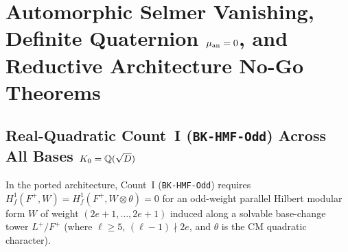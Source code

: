 \section{Automorphic Selmer Vanishing, Definite Quaternion $\mu_{\mathrm{an}}=0$, and Reductive Architecture No-Go Theorems}\label{sec:5:selmer}

\subsection{Real-Quadratic Count~I (\texttt{BK-HMF-Odd}) Across All Bases $K_0 = \mathbb{Q}(\sqrt{D})$}\label{sec:5:count1}

In the ported architecture, Count~I (\texttt{BK-HMF-Odd}) requires $H^1_f(F^+, W) = H^1_f(F^+, W \otimes \theta) = 0$ for an odd-weight parallel Hilbert modular form $W$ of weight $(2e+1, \dots, 2e+1)$ induced along a solvable base-change tower $L^+/F^+$ (where $\ell \ge 5$, $(\ell-1)\nmid 2e$, and $\theta$ is the CM quadratic character).

